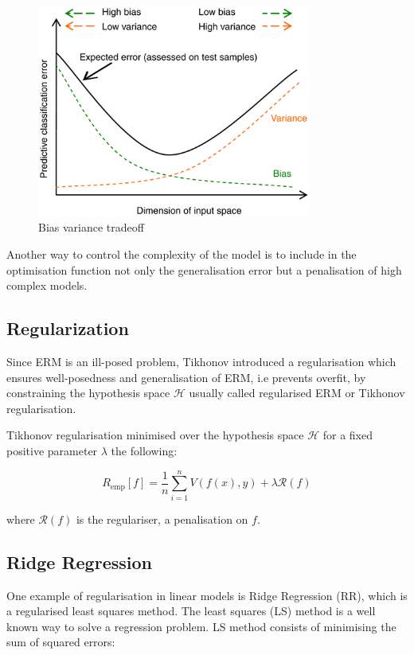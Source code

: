 \begin{figure}[!h]
  \centering
  \includegraphics[width=0.8\textwidth]{img/biasvariancetradeoff}
  \caption{Bias variance tradeoff}
  \label{fig:bvtradeoff}
\end{figure}

Another way to control the complexity of the model is to include in the optimisation function not only the generalisation error but a penalisation of high complex models. 


\subsection{Regularization}
Since ERM is an ill-posed problem, Tikhonov introduced a regularisation which ensures well-posedness and generalisation of ERM, i.e prevents overfit, by constraining the hypothesis space $\mathcal{H}$ usually called regularised ERM or Tikhonov regularisation.

Tikhonov regularisation minimised over the hypothesis space $\mathcal{H}$ for a fixed positive parameter $\lambda$ the following:

\begin{equation} 
\label{eq:rerm}
R_{\text{emp}}[f] = \frac{1}{n} \sum_{i=1}^n V(f(x),y) + \lambda \mathcal{R}(f)
\end{equation}

\noindent where $\mathcal{R}(f)$ is the regulariser, a penalisation on $f$.

\subsection{Ridge Regression}
One example of regularisation in linear models is Ridge Regression (RR), which is a regularised least squares method.
The least squares (LS) method is a well known way to solve a regression
problem. 
LS method consists of minimising the sum of squared errors:

